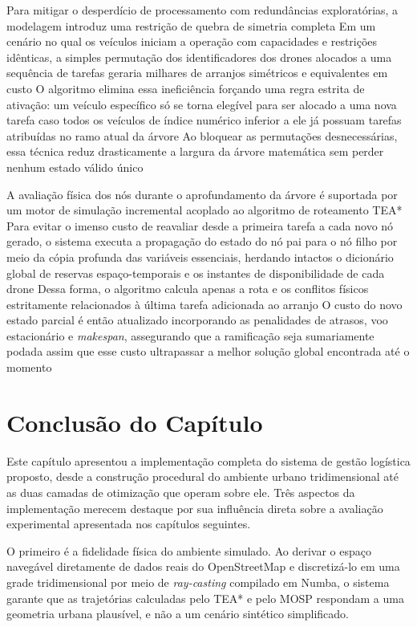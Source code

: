 Para mitigar o desperdício de processamento com redundâncias exploratórias, a modelagem introduz uma restrição de quebra de simetria completa %
Em um cenário no qual os veículos iniciam a operação com capacidades e restrições idênticas, a simples permutação dos identificadores dos drones alocados a uma sequência de tarefas geraria milhares de arranjos simétricos e equivalentes em custo %
O algoritmo elimina essa ineficiência forçando uma regra estrita de ativação: um veículo específico só se torna elegível para ser alocado a uma nova tarefa caso todos os veículos de índice numérico inferior a ele já possuam tarefas atribuídas no ramo atual da árvore %
Ao bloquear as permutações desnecessárias, essa técnica reduz drasticamente a largura da árvore matemática sem perder nenhum estado válido único %

A avaliação física dos nós durante o aprofundamento da árvore é suportada por um motor de simulação incremental acoplado ao algoritmo de roteamento TEA* %
Para evitar o imenso custo de reavaliar desde a primeira tarefa a cada novo nó gerado, o sistema executa a propagação do estado do nó pai para o nó filho por meio da cópia profunda das variáveis essenciais, herdando intactos o dicionário global de reservas espaço-temporais e os instantes de disponibilidade de cada drone %
Dessa forma, o algoritmo calcula apenas a rota e os conflitos físicos estritamente relacionados à última tarefa adicionada ao arranjo %
O custo do novo estado parcial é então atualizado incorporando as penalidades de atrasos, voo estacionário e \textit{makespan}, assegurando que a ramificação seja sumariamente podada assim que esse custo ultrapassar a melhor solução global encontrada até o momento %

\section{Conclusão do Capítulo}

Este capítulo apresentou a implementação completa do sistema de gestão logística proposto, desde a construção procedural do ambiente urbano tridimensional até as duas camadas de otimização que operam sobre ele. Três aspectos da implementação merecem destaque por sua influência direta sobre a avaliação experimental apresentada nos capítulos seguintes.

O primeiro é a fidelidade física do ambiente simulado. Ao derivar o espaço navegável diretamente de dados reais do OpenStreetMap e discretizá-lo em uma grade tridimensional por meio de \textit{ray-casting} compilado em Numba, o sistema garante que as trajetórias calculadas pelo TEA* e pelo MOSP respondam a uma geometria urbana plausível, e não a um cenário sintético simplificado.

